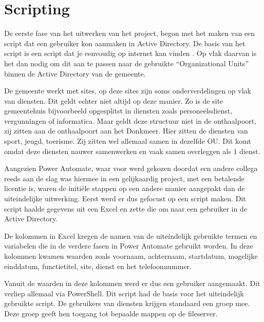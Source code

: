 
\chapter{Scripting}
\label{ch:Scripting}

De eerste fase van het uitwerken van het project, begon met het maken van een script dat een gebruiker kon aanmaken in Active Directory. De basis van het script is een script dat je eenvoudig op internet kan vinden \autocite{Microsoft2024a}. Op vlak daarvan is het dan nodig om dit aan te passen naar de gebruikte ``Organizational Units'' binnen de Active Directory van de gemeente. \newline

De gemeente werkt met sites, op deze sites zijn soms onderverdelingen op vlak van diensten. Dit geldt echter niet altijd op deze manier. Zo is de site gemeentehuis bijvoorbeeld opgesplitst in diensten zoals personeelsdienst, vergunningen of informatica. Maar geldt deze structuur niet in de onthaalpoort, zij zitten aan de onthaalpoort aan het Donkmeer. Hier zitten de diensten van sport, jeugd, toerisme. Zij zitten wel allemaal samen in dezelfde OU. Dit komt omdat deze diensten nauwer samenwerken en vaak samen overleggen als 1 dienst.\newline 

Aangezien Power Automate, waar voor werd gekozen doordat een andere collega reeds aan de slag was hiermee in een gelijkaardig project, met een betalende licentie is, waren de initiële stappen op een andere manier aangepakt dan de uiteindelijke uitwerking. Eerst werd er dus gefocust op een script maken. Dit script haalde gegevens uit een Excel en zette die om naar een gebruiker in de Active Directory. \newline

De kolommen in Excel kregen de namen van de uiteindelijk gebruikte termen en variabelen die in de verdere fasen in Power Automate gebruikt worden. In deze kolommen kwamen waarden zoals voornaam, achternaam, startdatum, mogelijke einddatum, functietitel, site, dienst en het telefoonnummer.\newline 

Vanuit de waarden in deze kolommen werd er dus een gebruiker aangemaakt. Dit verliep allemaal via PowerShell. Dit script had de basis voor het uiteindelijk gebruikte script. De gebruikers van diensten krijgen standaard een groep mee. Deze groep geeft hen toegang tot bepaalde mappen op de fileserver. \newline

